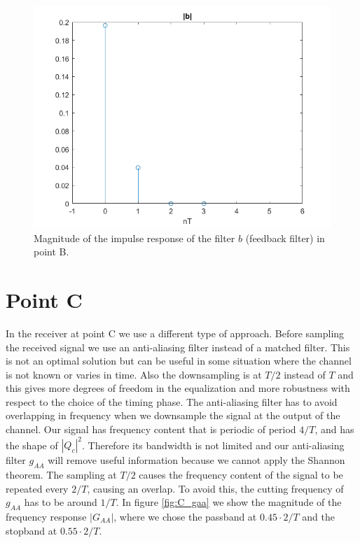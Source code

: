 \documentclass[a4paper,11.5pt]{article}
\begin{document}
\begin{figure}[ht]
	\begin{center}   
		\includegraphics[width=\textwidth]{figs/B_b.png} 
		\caption{Magnitude of the impulse response of the filter $b$ (feedback filter) in point B.}
		\label{fig:B_b}
	\end{center}
\end{figure}

\section*{Point C}

In the receiver at point C we use a different type of approach. Before sampling the received signal we use an anti-aliasing filter instead of a matched filter. This is not an optimal solution but can be useful in some situation where the channel is not known or varies in time. Also the downsampling is at $T/2$ instead of $T$ and this gives more degrees of freedom in the equalization and more robustness with respect to the choice of the timing phase. The anti-aliasing filter has to avoid overlapping in frequency when we downsample the signal at the output of the channel. Our signal has frequency content that is periodic of period $4/T$, and has the shape of $|Q_c|^2$. Therefore its bandwidth is not limited and our anti-aliasing filter $g_{AA}$ will remove useful information because we cannot apply the Shannon theorem. The sampling at $T/2$ causes the frequency content of the signal to be repeated every $2/T$, causing an overlap. To avoid this, the cutting frequency of $g_{AA}$ has to be around $1/T$. In figure \ref{fig:C_gaa} we show the magnitude of the frequency response $|G_{AA}|$, where we chose the passband at $0.45 \cdot 2/T$ and the stopband at $0.55\cdot 2/T$.
\end{document}

